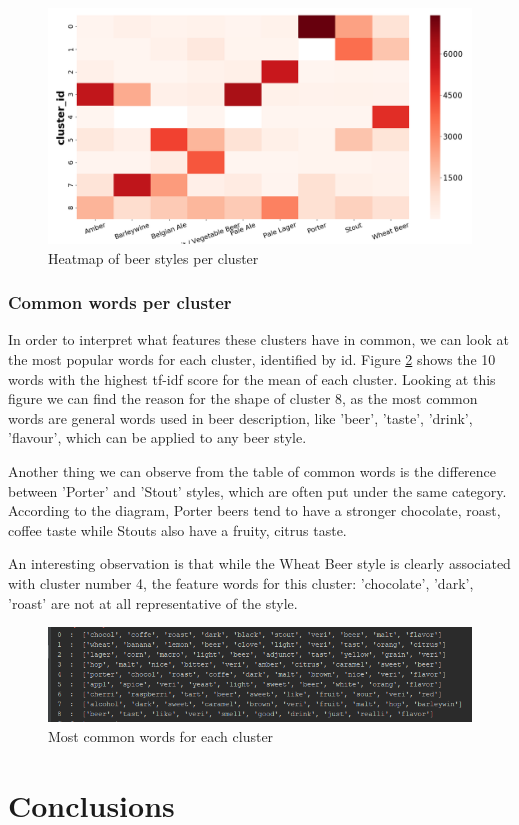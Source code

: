 \documentclass[12pt]{article}
\begin{document}
	\begin{figure}
		\includegraphics[width=\linewidth]{resources/9500rheatmap.png}
		\caption{Heatmap of beer styles per cluster}
		\label{fig:heatmap}
	\end{figure}
	
	\subsubsection{Common words per cluster}
	In order to interpret what features these clusters have in common, we can look at the most popular words for each cluster, identified by id. Figure \ref{fig:words} shows the 10 words with the highest tf-idf score for the mean of each cluster. Looking at this figure we can find the reason for the shape of cluster 8, as the most common words are general words used in beer description, like 'beer', 'taste', 'drink', 'flavour', which can be applied to any beer style. 
	
	Another thing we can observe from the table of common words is the difference between 'Porter' and 'Stout' styles, which are often put under the same category. According to the diagram, Porter beers tend to have a stronger chocolate, roast, coffee taste while Stouts also have a fruity, citrus taste.
	
	An interesting observation is that while the Wheat Beer style is clearly associated with cluster number 4, the feature words for this cluster: 'chocolate', 'dark', 'roast' are not at all representative of the style.
	
	\begin{figure}
		\includegraphics[width=\linewidth]{resources/words.png}
		\caption{Most common words for each cluster}
		\label{fig:words}
	\end{figure}
	
	\section{Conclusions}
	
	\newpage
	
	
\end{document}
